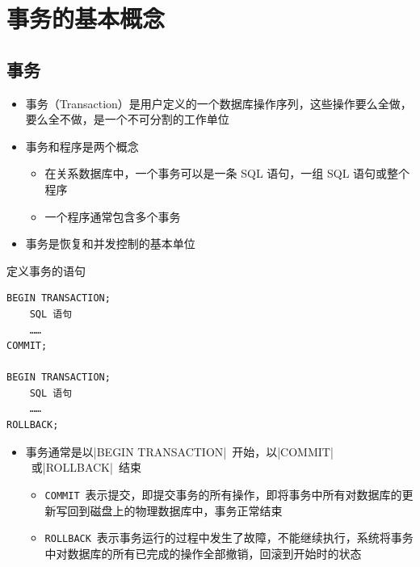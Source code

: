 \section{事务的基本概念}

\subsection{事务}
\begin{itemize}
    \item 事务（Transaction）是用户定义的一个数据库操作序列，这些操作要么全做，要么全不做，是一个不可分割的工作单位
    \item 事务和程序是两个概念
    \begin{itemize}
        \item 在关系数据库中，一个事务可以是一条 SQL 语句，一组 SQL 语句或整个程序
        \item 一个程序通常包含多个事务
    \end{itemize} 
    \item 事务是恢复和并发控制的基本单位
\end{itemize}

定义事务的语句
\begin{lstlisting}
BEGIN TRANSACTION;
	SQL 语句
	……
COMMIT;

BEGIN TRANSACTION;
	SQL 语句
	……
ROLLBACK;
\end{lstlisting}

\begin{itemize}
    \item 事务通常是以\sverb|BEGIN TRANSACTION|\ 开始，以\sverb|COMMIT|\ 或\sverb|ROLLBACK|\ 结束
    \begin{itemize}
        \item \verb|COMMIT|\ 表示提交，即提交事务的所有操作，即将事务中所有对数据库的更新写回到磁盘上的物理数据库中，事务正常结束
        \item \verb|ROLLBACK|\ 表示事务运行的过程中发生了故障，不能继续执行，系统将事务中对数据库的所有已完成的操作全部撤销，回滚到开始时的状态
    \end{itemize}
\end{itemize}

